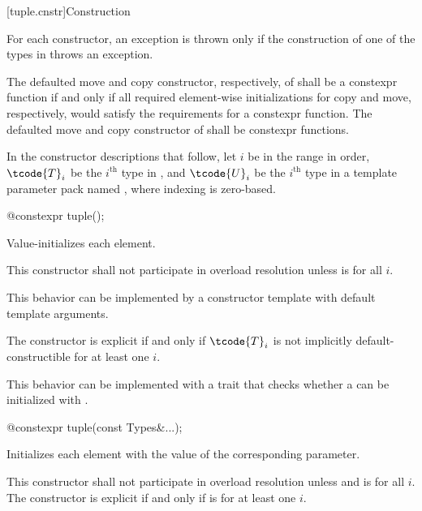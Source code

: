 [tuple.cnstr]{Construction}

\pnum
For each  constructor, an exception is thrown only if the construction of
one of the types in  throws an exception.

\pnum
The defaulted move and copy constructor, respectively, of
 shall be a constexpr function if and only if all
required element-wise initializations for copy and move, respectively,
would satisfy the requirements for a constexpr function. The
defaulted move and copy constructor of  shall be
constexpr functions.

\pnum
In the constructor descriptions that follow, let $i$ be in the range
 in order, $\tcode{T}_i$
be the $i^\text{th}$ type in , and
$\tcode{U}_i$ be the $i^\text{th}$ type in a template parameter pack named , where indexing
is zero-based.

%
\begin{itemdecl}
@\EXPLICIT@ constexpr tuple();
\end{itemdecl}

\begin{itemdescr}
\pnum
\effects Value-initializes each element.

\pnum
\remarks
This constructor shall not participate in overload resolution unless
 is  for all $i$.
\begin{note} This behavior can be implemented by a constructor template
with default template arguments. \end{note}
The constructor is explicit if and only if $\tcode{T}_i$ is not implicitly
default-constructible for at least one $i$.
\begin{note} This behavior can be implemented with a trait that checks whether
a  can be initialized with \tcode{\{\}}. \end{note}
\end{itemdescr}

%
\begin{itemdecl}
@\EXPLICIT@ constexpr tuple(const Types&...);
\end{itemdecl}

\begin{itemdescr}
\pnum
\effects Initializes each element with the value of the
corresponding parameter.

\pnum
\remarks This constructor shall not participate in overload resolution unless
 and 
is  for all $i$. The constructor is explicit if and only if
 is 
for at least one $i$.
\end{itemdescr}


